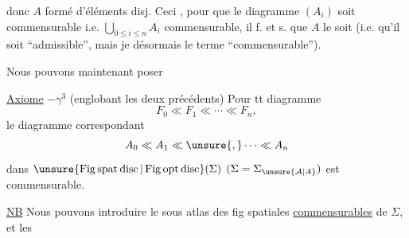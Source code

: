 
donc $A$ formé d'éléments  disj. Ceci , pour que le diagramme $(A_i)$ soit commensurable i.e. $\bigcup_{0\leq i\leq n}A_i$ commensurable, il f. et s. que $A$ le soit (i.e. qu'il soit ``admissible'', mais je  désormais le terme ``commensurable'').

Nous pouvons maintenant poser

\uline{Axiome} \uline{ $-\gamma^3$} (englobant les deux précédents) Pour tt diagramme
\[
F_0\ll F_1\ll\cdots\ll F_n,
\]
le diagramme correspondant
\[
A_0\ll A_1\ll\unsure{,}\cdots\ll A_n
\]
dans $\unsure{\operatorname{Fig\,spat\,disc}|\operatorname{Fig\,opt\,disc}}(\Sigma)$ $(\Sigma=\Sigma_{\unsure{\mathcal A|A}})$ est commensurable.

\uline{NB} Nous pouvons introduire  le sous atlas  des fig  spatiales \uline{commensurables} de $\Sigma$, et  les  
